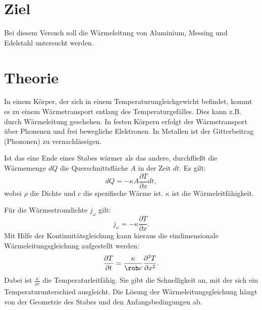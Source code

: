 \section{Ziel}
\label{sec:Ziel}

Bei diesem Versuch soll die Wärmeleitung von Aluminium, Messing und Edelstahl untersucht werden. 

\section{Theorie}
\label{sec:Theorie}

In einem Körper, der sich in einem Temperaturungleichgewicht befindet, kommt es zu einem Wärmetransport entlang 
des Temperaturgefälles. Dies kann z.B. durch Wärmeleitung geschehen. In festen Körpern erfolgt der Wärmetransport 
über Phonenen und frei bewegliche Elektronen. In Metallen ist der Gitterbeitrag (Phononen) zu vernachlässigen. 

\noindent Ist das eine Ende eines Stabes wärmer als das andere, durchfließt die Wärmemenge $dQ$ die Querschnittsfläche $A$ in der Zeit $dt$. Es gilt:
\begin{equation}
dQ = -\kappa A \frac{\partial T}{\partial x} dt,
\label{eq:dQ}
\end{equation}
wobei $\rho$ die Dichte und $c$ die spezifische Wärme ist.
$\kappa$ ist die Wärmeleitfähigkeit.

\noindent Für die Wärmestromdichte $j_{\omega}$ gilt:
\begin{equation}
    j_{\omega} = -\kappa \frac{\partial T}{\partial x}.
    \label{eq:jomega}
\end{equation}
Mit Hilfe der Kontinuitätsgleichung kann hieraus die eindimensionale Wärmeleitungsgleichung aufgestellt werden:
\begin{equation}
    \frac{\partial T}{\partial t} = \frac{\kappa}{\roh c} \frac{\partial^2 T}{\partial x^2}.
    \label{eq:warmeleitung}
\end{equation}
Dabei ist $\frac{\kappa}{\rho c}$ die Temperaturleitfähig. Sie gibt die Schnelligkeit an, mit der sich ein 
Temperaturunterschied ausgleicht. Die Lösung der Wärmeleitungsgleichung hängt von der Geometrie des Stabes und den Anfangsbedingungen ab. 


